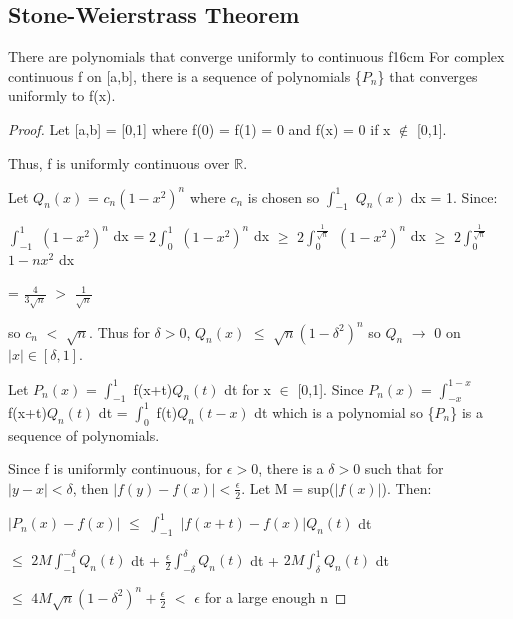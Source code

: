 \subsection[ Stone-Weierstrass ]{ Stone-Weierstrass Theorem }

    \begin{wtheorem}{There are polynomials that converge uniformly to
    continuous f}{16cm}
        For complex continuous f on [a,b], there is a sequence of polynomials
        \{$P_n$\} that converges uniformly to f(x).
    \end{wtheorem}

    \begin{proof}
        Let [a,b] = [0,1] where f(0) = f(1) = 0 and f(x) = 0 if x $\not \in$ [0,1].

        Thus, f is uniformly continuous over $\mathbb{R}$.

        Let $Q_n(x)$ = $c_n(1-x^2)^n$ where $c_n$ is chosen so
        $\int_{-1}^1$ $Q_n(x)$ dx = 1.
        Since:

        \hspace{0.5cm}
        $\int_{-1}^1$ $(1-x^2)^n$ dx
        = $2 \int_0^1$ $(1-x^2)^n$ dx
        $\geq$ $2 \int_0^{\frac{1}{\sqrt{n}}}$ $(1-x^2)^n$ dx
        $\geq$ $2 \int_0^{\frac{1}{\sqrt{n}}}$ $1-nx^2$ dx

        \hspace{3.6cm}
        = $\frac{4}{3\sqrt{n}}$
        $>$ $\frac{1}{\sqrt{n}}$

        so $c_n$ $<$ $\sqrt{n}$.
        Thus for $\delta > 0$, $Q_n(x)$ $\leq$ $\sqrt{n}(1-\delta^2)^n$
        so $Q_n$ $\rightarrow$ 0 on $|x| \in [\delta,1]$.

        Let $P_n(x)$ = $\int_{-1}^1$ f(x+t)$Q_n(t)$ dt for x $\in$ [0,1].
        Since $P_n(x)$ = $\int_{-x}^{1-x}$ f(x+t)$Q_n(t)$ dt
        = $\int_0^1$ f(t)$Q_n(t-x)$ dt which is a polynomial so \{$P_n$\}
        is a sequence of polynomials.

        Since f is uniformly continuous, for $\epsilon > 0$, there is a $\delta > 0$
        such that for $|y-x| < \delta$, then $|f(y) - f(x)| < \frac{\epsilon}{2}$.
        Let M = sup($|f(x)|$). Then:

        \hspace{0.5cm}
        $|P_n(x) - f(x)|$
        $\leq$ $\int_{-1}^1$ $|f(x+t)-f(x)| Q_n(t)$ dt

        \hspace{3.2cm}
        $\leq$ $2M \int_{-1}^{-\delta} Q_n(t)$ dt
                + $\frac{\epsilon}{2} \int_{-\delta}^{\delta} Q_n(t)$ dt
                + $2M \int_{\delta}^{1} Q_n(t)$ dt

        \hspace{3.2cm}
        $\leq$ $4M\sqrt{n}(1-\delta^2)^n + \frac{\epsilon}{2}$
        $<$ $\epsilon$
        \hspace{1cm}
        for a large enough n
    \end{proof}

